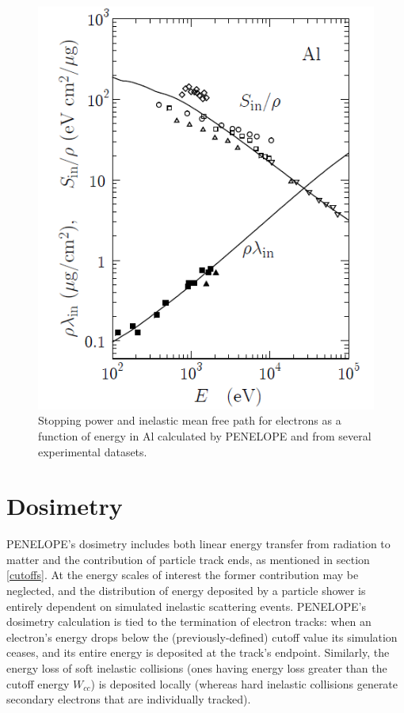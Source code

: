 \documentclass [11pt, proquest, article] {uwthesis}[2016/11/22]
\begin{document}



\begin{figure}[h] 
\caption{Stopping power and inelastic mean free path for electrons as a function of energy in Al calculated by PENELOPE and from several experimental datasets.\cite{fernandez1993inelastic}}
\label{fig:stp_accuracy}
\centering
\includegraphics[scale=0.7]{../Figures/penelope_3_11.png}
\end{figure}

\section{Dosimetry}
PENELOPE's dosimetry includes both linear energy transfer from radiation to matter and the contribution of particle track ends, as mentioned in section \ref{cutoffs}. At the energy scales of interest the former contribution may be neglected, and the distribution of energy deposited by a particle shower is entirely dependent on simulated inelastic scattering events. PENELOPE's dosimetry calculation is tied to the termination of electron tracks: when an electron's energy drops below the (previously-defined) cutoff value its simulation ceases, and its entire energy is deposited at the track's endpoint.  Similarly, the energy loss of soft inelastic collisions (ones having energy loss greater than the cutoff energy $W_{cc}$) is deposited locally (whereas hard inelastic collisions generate secondary electrons that are individually tracked). 
\end{document}
